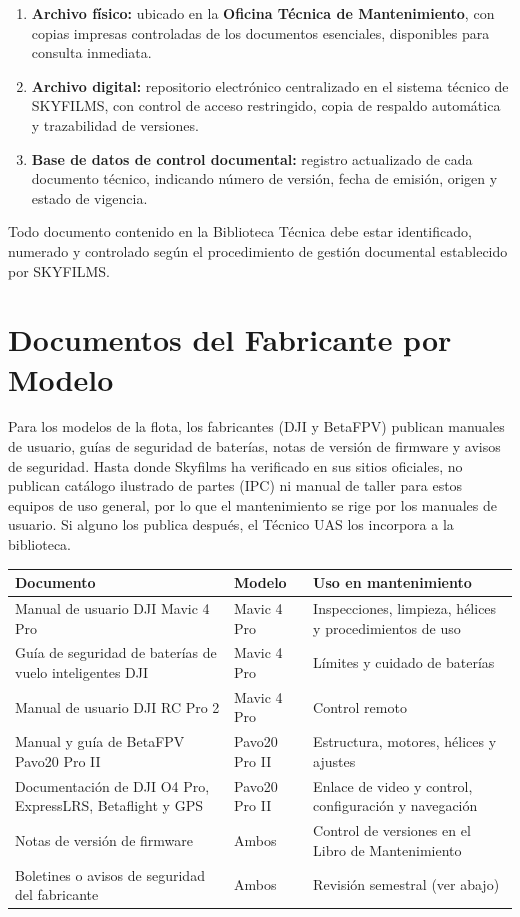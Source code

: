 \begin{enumerate}
    \item \textbf{Archivo físico:} ubicado en la \textbf{Oficina Técnica de Mantenimiento}, con copias impresas controladas de los documentos esenciales, disponibles para consulta inmediata.

    \item \textbf{Archivo digital:} repositorio electrónico centralizado en el sistema técnico de SKYFILMS, con control de acceso restringido, copia de respaldo automática y trazabilidad de versiones.

    \item \textbf{Base de datos de control documental:} registro actualizado de cada documento técnico, indicando número de versión, fecha de emisión, origen y estado de vigencia.
\end{enumerate}

Todo documento contenido en la Biblioteca Técnica debe estar identificado, numerado y controlado según el procedimiento de gestión documental establecido por SKYFILMS.

\section{Documentos del Fabricante por Modelo}
Para los modelos de la flota, los fabricantes (DJI y BetaFPV) publican manuales de usuario, guías de seguridad de baterías, notas de versión de firmware y avisos de seguridad. Hasta donde Skyfilms ha verificado en sus sitios oficiales, no publican catálogo ilustrado de partes (IPC) ni manual de taller para estos equipos de uso general, por lo que el mantenimiento se rige por los manuales de usuario. Si alguno los publica después, el Técnico UAS los incorpora a la biblioteca.

\begin{longtable}{|>{\raggedright\arraybackslash}p{4.6cm}|>{\raggedright\arraybackslash}p{3.2cm}|>{\raggedright\arraybackslash}p{5.9cm}|}
\hline
\rowcolor[gray]{0.9}\textbf{Documento} & \textbf{Modelo} & \textbf{Uso en mantenimiento} \\ \hline
\endhead
Manual de usuario DJI Mavic 4 Pro & Mavic 4 Pro & Inspecciones, limpieza, hélices y procedimientos de uso \\ \hline
Guía de seguridad de baterías de vuelo inteligentes DJI & Mavic 4 Pro & Límites y cuidado de baterías \\ \hline
Manual de usuario DJI RC Pro 2 & Mavic 4 Pro & Control remoto \\ \hline
Manual y guía de BetaFPV Pavo20 Pro II & Pavo20 Pro II & Estructura, motores, hélices y ajustes \\ \hline
Documentación de DJI O4 Pro, ExpressLRS, Betaflight y GPS & Pavo20 Pro II & Enlace de video y control, configuración y navegación \\ \hline
Notas de versión de firmware & Ambos & Control de versiones en el Libro de Mantenimiento \\ \hline
Boletines o avisos de seguridad del fabricante & Ambos & Revisión semestral (ver abajo) \\ \hline
\end{longtable}

